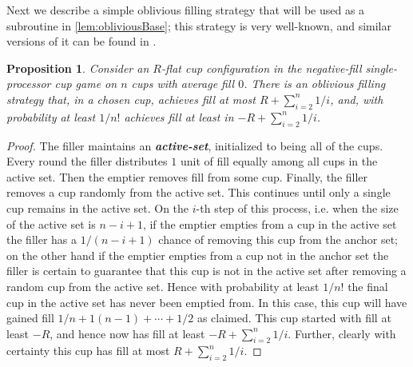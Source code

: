 \documentclass[twocolumn]{article}[10pt]
\newcommand{\defn}[1]{{\textit{\textbf{\boldmath #1}}}\xspace}
\newtheorem{proposition}{Proposition}
\begin{document}
Next we describe a simple oblivious filling strategy that will be used as a
subroutine in \cref{lem:obliviousBase}; this strategy is very
well-known, and similar versions of it can be found in
\cite{ mbe19, mbe15, die91, wku20}.
\begin{proposition}
  \label{prop:obliviousTerribleProbability}
  Consider an $R$-flat cup configuration in the negative-fill
  single-processor cup game on $n$ cups with average fill $0$.
  There is an oblivious filling strategy that, in a chosen cup,
  achieves fill at most $R + \sum_{i=2}^{n} 1/i$, and, with probability at
  least $1/n!$ achieves fill at least  in $-R + \sum_{i=2}^{n} 1/i$.
\end{proposition}
\begin{proof}
  The filler maintains an \defn{active-set}, initialized to being
  all of the cups. Every round the filler distributes $1$ unit of
  fill equally among all cups in the active set. Then the emptier
  removes fill from some cup. Finally, the filler removes a cup
  randomly from the active set. This continues until only a single cup
  remains in the active set. On the $i$-th step of this process,
  i.e. when the size of the active set is $n-i+1$, if the emptier
  empties from a cup in the active set the filler has a
  $1/(n-i+1)$ chance of removing this cup from the anchor set; on
  the other hand if the emptier empties from a cup not in the
  anchor set the filler is certain to guarantee that this cup is
  not in the active set after removing a random cup from the
  active set. Hence with probability at least $1/n!$ the final
  cup in the active set has never been emptied from.
  In this case, this cup will have gained fill $1/n+1(n-1) +
  \cdots + 1/2$ as claimed. This cup started with fill at
  least $-R$, and hence now has fill at least $-R+ \sum_{i=2}^n
  1/i$. Further, clearly with certainty this cup has fill at most $R +
  \sum_{i=2}^n 1/i$.
\end{proof}
\end{document}
